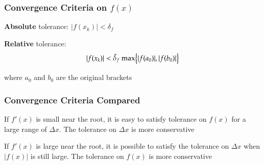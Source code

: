 \documentclass[10pt]{beamer}
\begin{document}
\begin{frame}
\frametitle{Convergence Criteria on $f(x)$}

\vspace{2ex}

\begin{center}
\end{center}

\vspace{3ex}
\textbf{Absolute} tolerance: $\bigl| f(x_k) \bigr| < \delta_f$

\vspace{3ex}
\textbf{Relative} tolerance:
\begin{equation*}
    |f(x_k)| < \hat{\delta}_f\ \mathrm{max} \Bigl\{ |f(a_0)|, |f(b_0)| \Bigr\}
\end{equation*}

where $a_0$ and $b_0$ are the original brackets


\end{frame}
\begin{frame}[shrink]
\frametitle{Convergence Criteria Compared}


If $f'(x)$ is small near the root, it is easy to satisfy tolerance on $f(x)$ for
a large range of $\Delta x$. The tolerance on $\Delta x$ is more conservative
\begin{center}
\end{center}

\vspace{3ex}
If $f'(x)$ is large near the root, it is possible to satisfy the tolerance on
$\Delta x$ when $|f(x)|$ is still large.  The tolerance on $f(x)$ is more
conservative
\begin{center}
\end{center}



\end{frame}
\end{document}
